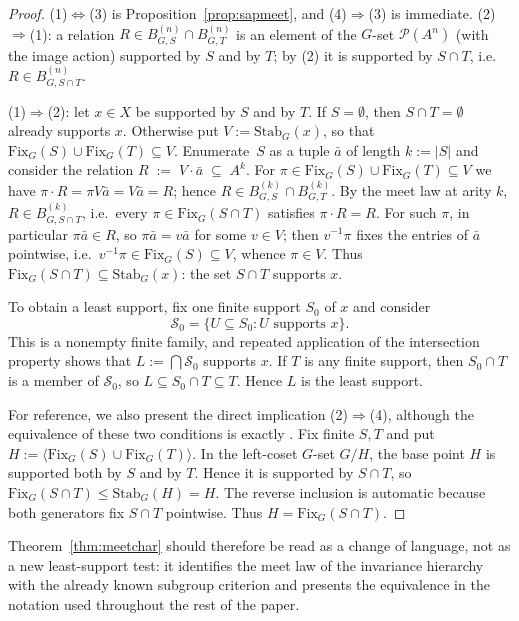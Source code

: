 \documentclass{lmcs}
\newcommand{\Fix}{\mathrm{Fix}}
\begin{document}
\begin{proof}
(1)$\Leftrightarrow$(3) is Proposition~\ref{prop:sapmeet}, and
(4)$\Rightarrow$(3) is immediate.
(2)$\Rightarrow$(1): a relation $R\in B^{(n)}_{G,S}\cap B^{(n)}_{G,T}$ is an element of the $G$-set $\mathcal P(A^n)$ (with the image action) supported by $S$ and by $T$; by (2) it is supported by $S\cap T$, i.e.\ $R\in B^{(n)}_{G,S\cap T}$.

(1)$\Rightarrow$(2): let $x\in X$ be supported by $S$ and by $T$. If $S=\emptyset$, then $S\cap T=\emptyset$ already supports $x$. Otherwise put $V:=\mathrm{Stab}_G(x)$, so that
$\Fix_G(S)\cup\Fix_G(T)\subseteq V$. Enumerate~$S$ as a tuple
$\bar a$ of length $k:=|S|$ and consider the relation
$R\;:=\;V\cdot\bar a\;\subseteq\;A^{k}$.
For $\pi\in\Fix_G(S)\cup\Fix_G(T)\subseteq V$ we have
$\pi\cdot R=\pi V\bar a=V\bar a=R$; hence
$R\in B^{(k)}_{G,S}\cap B^{(k)}_{G,T}$. By the meet law at arity $k$,
$R\in B^{(k)}_{G,S\cap T}$, i.e.\ every $\pi\in\Fix_G(S\cap T)$
satisfies $\pi\cdot R=R$. For such $\pi$, in particular
$\pi\bar a\in R$, so $\pi\bar a=v\bar a$ for some $v\in V$; then
$v^{-1}\pi$ fixes the entries of $\bar a$ pointwise, i.e.\
$v^{-1}\pi\in\Fix_G(S)\subseteq V$, whence $\pi\in V$. Thus
$\Fix_G(S\cap T)\subseteq\mathrm{Stab}_G(x)$: the set $S\cap T$
supports $x$.

To obtain a least support, fix one finite support $S_0$ of $x$ and
consider
\[
   \mathcal S_0=\{U\subseteq S_0:U\text{ supports }x\}.
\]
This is a nonempty finite family, and repeated application of the
intersection property shows that
$L:=\bigcap\mathcal S_0$ supports $x$. If $T$ is any finite support,
then $S_0\cap T$ is a member of $\mathcal S_0$, so
$L\subseteq S_0\cap T\subseteq T$. Hence $L$ is the least support.

For reference, we also present the direct implication (2)$\Rightarrow$(4), although the equivalence of these two conditions is exactly \cite[Fact~9.2]{BKL14}. Fix finite $S,T$ and put
$H:=\bigl\langle\Fix_G(S)\cup\Fix_G(T)\bigr\rangle$.
In the left-coset $G$-set $G/H$, the base point $H$ is supported both
by $S$ and by $T$. Hence it is supported by $S\cap T$, so
$\Fix_G(S\cap T)\leq\mathrm{Stab}_G(H)=H$. The reverse inclusion is
automatic because both generators fix $S\cap T$ pointwise. Thus
$H=\Fix_G(S\cap T)$.
\end{proof}

Theorem~\ref{thm:meetchar} should therefore be read as a change of language, not as a new least-support test: it identifies the meet law of the invariance hierarchy with the already known subgroup criterion and presents the equivalence in the notation used throughout the rest of the paper.
\end{document}
